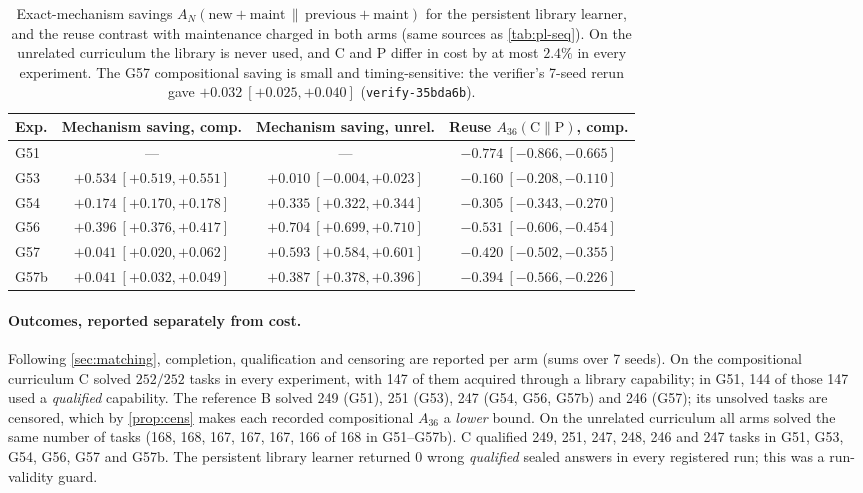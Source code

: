 \documentclass[11pt]{article}
\theoremstyle{remark}
\begin{document}
\begin{table}[ht]
\centering\small
\begin{tabular}{@{}lccc@{}}
\toprule
Exp. & Mechanism saving, comp. & Mechanism saving, unrel. & Reuse $A_{36}(\text{C}\|\text{P})$, comp.\\
\midrule
G51 & --- & --- & $-0.774\ [-0.866,-0.665]$\\
G53 & $+0.534\ [+0.519,+0.551]$ & $+0.010\ [-0.004,+0.023]$ & $-0.160\ [-0.208,-0.110]$\\
G54 & $+0.174\ [+0.170,+0.178]$ & $+0.335\ [+0.322,+0.344]$ & $-0.305\ [-0.343,-0.270]$\\
G56 & $+0.396\ [+0.376,+0.417]$ & $+0.704\ [+0.699,+0.710]$ & $-0.531\ [-0.606,-0.454]$\\
G57 & $+0.041\ [+0.020,+0.062]$ & $+0.593\ [+0.584,+0.601]$ & $-0.420\ [-0.502,-0.355]$\\
G57b & $+0.041\ [+0.032,+0.049]$ & $+0.387\ [+0.378,+0.396]$ & $-0.394\ [-0.566,-0.226]$\\
\bottomrule
\end{tabular}
\caption{Exact-mechanism savings $A_N(\text{new}{+}\text{maint}\,\|\,\text{previous}{+}\text{maint})$ for the persistent library learner, and the reuse contrast with maintenance charged in both arms (same sources as \cref{tab:pl-seq}). On the unrelated curriculum the library is never used, and C and P differ in cost by at most $2.4\%$ in every experiment. The G57 compositional saving is small and timing-sensitive: the verifier's 7-seed rerun gave $+0.032\ [+0.025,+0.040]$ (\texttt{verify-35bda6b}).}
\label{tab:pl-mech}
\end{table}

\paragraph{Outcomes, reported separately from cost.}
Following \cref{sec:matching}, completion, qualification and censoring are reported per arm (sums over 7 seeds). On the compositional curriculum C solved $252/252$ tasks in every experiment, with 147 of them acquired through a library capability; in G51, 144 of those 147 used a \emph{qualified} capability. The reference B solved 249 (G51), 251 (G53), 247 (G54, G56, G57b) and 246 (G57); its unsolved tasks are censored, which by \cref{prop:cens} makes each recorded compositional $A_{36}$ a \emph{lower} bound. On the unrelated curriculum all arms solved the same number of tasks (168, 168, 167, 167, 167, 166 of 168 in G51--G57b). C qualified 249, 251, 247, 248, 246 and 247 tasks in G51, G53, G54, G56, G57 and G57b. The persistent library learner returned $0$ wrong \emph{qualified} sealed answers in every registered run; this was a run-validity guard.
\end{document}
